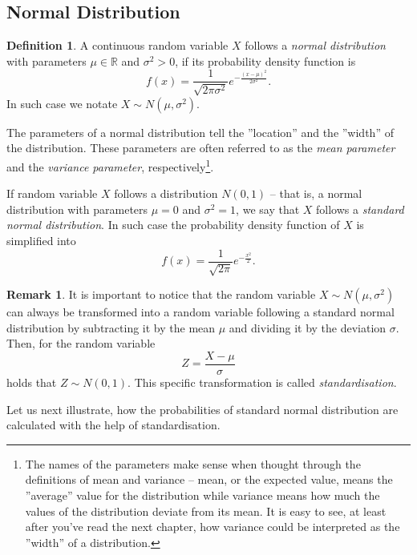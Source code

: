 \documentclass[12pt,a4paper,leqno]{report}
\newcommand{\R}{\mathbb{R}}
\theoremstyle{plain}
\theoremstyle{definition}
\newtheorem{maar}[equation]{Definition}
\newtheorem{remark}[equation]{Remark}
\begin{document}
\subsection{Normal Distribution}

\begin{maar}
A continuous random variable $X$ follows a \emph{normal distribution}  with parameters $\mu \in \R$ and $\sigma^2 > 0$, if its probability density function is
\[
f(x) = \frac{1}{\sqrt{2\pi \sigma^2}} e^{-\frac{(x-\mu)^2}{2\sigma^2}}.
\]
In such case we notate $X \sim N(\mu, \sigma^2)$.
\end{maar}

The parameters of a normal distribution tell the ''location'' and the ''width'' of the distribution. These parameters are often referred to as the \emph{mean parameter} and the \emph{variance parameter}, respectively\footnote{The names of the parameters make sense when thought through the definitions of mean and variance -- mean, or the expected value, means the ''average'' value for the distribution while variance means how much the values of the distribution deviate from its mean. It is easy to see, at least after you've read the next chapter, how variance could be interpreted as the ''width'' of a distribution.}.

If random variable $X$ follows a distribution $N(0,1)$ -- that is, a normal distribution with parameters $\mu=0$ and $\sigma^2=1$, we say that $X$ follows a \emph{standard normal distribution}. In such case the probability density function of $X$ is simplified into
\[
f(x) = \frac{1}{\sqrt{2\pi}} e^{-\frac{x^2}{2}}.
\]

\begin{remark}
\label{remark:norm}
It is important to notice that the random variable $X \sim N(\mu, \sigma^2)$ can always be transformed into a random variable following a standard normal distribution by subtracting it by the mean $\mu$ and dividing it by the deviation $\sigma$. Then, for the random variable
\[
Z = \frac{X-\mu}{\sigma}
\]
holds that $Z \sim N(0,1)$. This specific transformation is called \emph{standardisation}.
\end{remark}

Let us next illustrate, how the probabilities of standard normal distribution are calculated with the help of standardisation.
\end{document}
